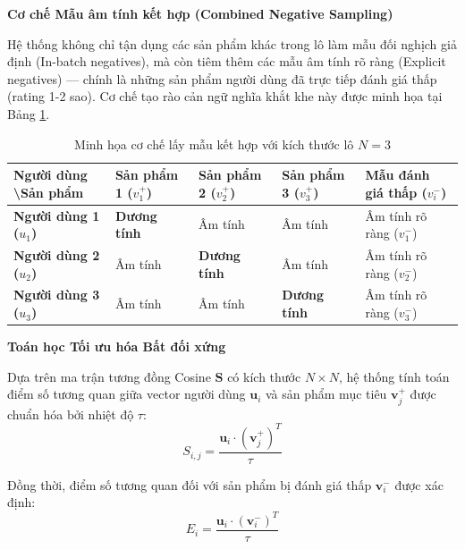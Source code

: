 \vspace{0.3cm}
\noindent \textbf{Cơ chế Mẫu âm tính kết hợp (Combined Negative Sampling)}

Hệ thống không chỉ tận dụng các sản phẩm khác trong lô làm mẫu đối nghịch giả định (In-batch negatives), mà còn tiêm thêm các mẫu âm tính rõ ràng (Explicit negatives) — chính là những sản phẩm người dùng đã trực tiếp đánh giá thấp (rating 1-2 sao). Cơ chế tạo rào cản ngữ nghĩa khắt khe này được minh họa tại Bảng \ref{tab:in_batch_negatives}.

\begin{table}[H]
    \centering
    \caption{Minh họa cơ chế lấy mẫu kết hợp với kích thước lô $N=3$}
    \label{tab:in_batch_negatives}
    \renewcommand{\arraystretch}{1.5}
    \footnotesize
    \begin{tabularx}{\textwidth}{|>{\centering\arraybackslash}m{2.5cm}|>{\centering\arraybackslash}X|>{\centering\arraybackslash}X|>{\centering\arraybackslash}X|>{\centering\arraybackslash}X|}
    \hline
    \textbf{Người dùng \textbackslash Sản phẩm} & \textbf{Sản phẩm 1 ($v_1^+$)} & \textbf{Sản phẩm 2 ($v_2^+$)} & \textbf{Sản phẩm 3 ($v_3^+$)} & \textbf{Mẫu đánh giá thấp ($v_i^-$)} \\ \hline
    \textbf{Người dùng 1 ($u_1$)} & \cellcolor{green!20}\textbf{Dương tính} & \cellcolor{red!10}Âm tính & \cellcolor{red!10}Âm tính & \cellcolor{gray!30}Âm tính rõ ràng ($v_1^-$) \\ \hline
    \textbf{Người dùng 2 ($u_2$)} & \cellcolor{red!10}Âm tính & \cellcolor{green!20}\textbf{Dương tính} & \cellcolor{red!10}Âm tính & \cellcolor{gray!30}Âm tính rõ ràng ($v_2^-$) \\ \hline
    \textbf{Người dùng 3 ($u_3$)} & \cellcolor{red!10}Âm tính & \cellcolor{red!10}Âm tính & \cellcolor{green!20}\textbf{Dương tính} & \cellcolor{gray!30}Âm tính rõ ràng ($v_3^-$) \\ \hline
    \end{tabularx}
\end{table}

\vspace{0.3cm}
\noindent \textbf{Toán học Tối ưu hóa Bất đối xứng}

Dựa trên ma trận tương đồng Cosine $\mathbf{S}$ có kích thước $N \times N$, hệ thống tính toán điểm số tương quan giữa vector người dùng $\mathbf{u}_i$ và sản phẩm mục tiêu $\mathbf{v}_j^+$ được chuẩn hóa bởi nhiệt độ $\tau$:
$$S_{i,j} = \frac{\mathbf{u}_i \cdot (\mathbf{v}_j^+)^T}{\tau}$$

Đồng thời, điểm số tương quan đối với sản phẩm bị đánh giá thấp $\mathbf{v}_i^-$ được xác định:
$$E_i = \frac{\mathbf{u}_i \cdot (\mathbf{v}_i^-)^T}{\tau}$$

